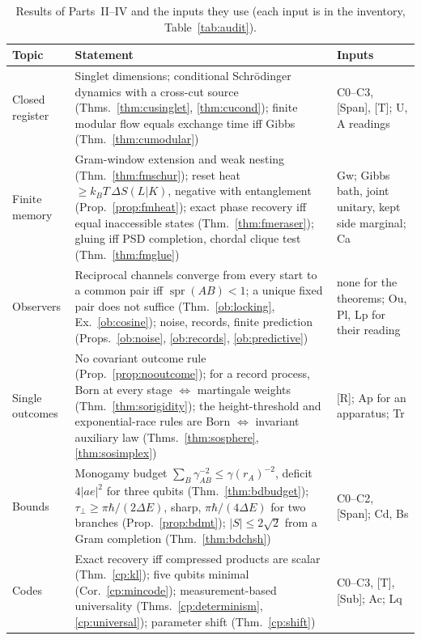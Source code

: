 \documentclass[aps,pra,onecolumn,superscriptaddress,nofootinbib,10pt]{revtex4-2}
\theoremstyle{definition}
\theoremstyle{remark}
\begin{document}
\begin{table}[h]
\caption{Results of Parts~II--IV and the inputs they use (each input is in the inventory, Table~\ref{tab:audit}).}
\label{tab:results}
\footnotesize
\begin{tabular}{@{}p{}p{}p{}@{}}
\toprule
Topic & Statement & Inputs\\
\midrule
Closed register & Singlet dimensions; conditional Schr\"odinger dynamics with a cross-cut source (Thms.~\ref{thm:cusinglet}, \ref{thm:cucond}); finite modular flow equals exchange time iff Gibbs (Thm.~\ref{thm:cumodular}) & C0--C3, [Span], [T]; U, A readings\\
Finite memory & Gram-window extension and weak nesting (Thm.~\ref{thm:fmschur}); reset heat $\ge k_BT\,\Delta S(L|K)$, negative with entanglement (Prop.~\ref{prop:fmheat}); exact phase recovery iff equal inaccessible states (Thm.~\ref{thm:fmeraser}); gluing iff PSD completion, chordal clique test (Thm.~\ref{thm:fmglue}) & Gw; Gibbs bath, joint unitary, kept side marginal; Ca\\
Observers & Reciprocal channels converge from every start to a common pair iff $\operatorname{spr}(AB)<1$; a unique fixed pair does not suffice (Thm.~\ref{ob:locking}, Ex.~\ref{ob:cosine}); noise, records, finite prediction (Props.~\ref{ob:noise}, \ref{ob:records}, \ref{ob:predictive}) & none for the theorems; Ou, Pl, Lp for their reading\\
Single outcomes & No covariant outcome rule (Prop.~\ref{prop:nooutcome}); for a record process, Born at every stage $\Leftrightarrow$ martingale weights (Thm.~\ref{thm:sorigidity}); the height-threshold and exponential-race rules are Born $\Leftrightarrow$ invariant auxiliary law (Thms.~\ref{thm:sosphere}, \ref{thm:sosimplex}) & [R]; Ap for an apparatus; Tr\\
Bounds & Monogamy budget $\sum_B\gamma_{AB}^{-2}\le\gamma(r_A)^{-2}$, deficit $4\lvert ae\rvert^2$ for three qubits (Thm.~\ref{thm:bdbudget}); $\tau_\perp\ge\pi\hbar/(2\Delta E)$, sharp, $\pi\hbar/(4\Delta E)$ for two branches (Prop.~\ref{prop:bdmt}); $\lvert S\rvert\le2\sqrt2$ from a Gram completion (Thm.~\ref{thm:bdchsh}) & C0--C2, [Span]; Cd, Bs\\
Codes & Exact recovery iff compressed products are scalar (Thm.~\ref{cp:kl}); five qubits minimal (Cor.~\ref{cp:mincode}); measurement-based universality (Thms.~\ref{cp:determinism}, \ref{cp:universal}); parameter shift (Thm.~\ref{cp:shift}) & C0--C3, [T], [Sub]; Ac; Lq\\

\end{tabular}
\end{table}
\end{document}
